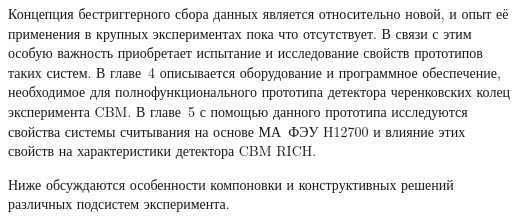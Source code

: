 Концепция бестриггерного сбора данных является относительно новой, и опыт её применения в крупных экспериментах пока что отсутствует. В связи с этим особую важность приобретает испытание и исследование свойств прототипов таких систем. В главе~4 описывается оборудование и программное обеспечение, необходимое для полнофункционального прототипа детектора черенковских колец эксперимента CBM. В главе~5 с помощью данного прототипа исследуются свойства системы считывания на основе МА~ФЭУ H12700 и влияние этих свойств на характеристики детектора CBM RICH.



Ниже обсуждаются особенности компоновки и конструктивных решений различных подсистем эксперимента.

\bigskip
